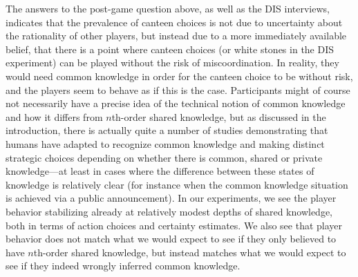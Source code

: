 The answers to the post-game question above, as well as the DIS interviews, indicates that the prevalence of canteen choices is not due to uncertainty about the rationality of other players, but instead due to a more immediately available belief, that there is a point where canteen choices (or white stones in the DIS experiment) can be played without the risk of miscoordination. In reality, they would need common knowledge in order for the canteen choice to be without risk, and the players seem to behave as if this is the case.
Participants might of course not necessarily have a precise idea of the technical notion of common knowledge and how it differs from $n$th-order shared knowledge, but as discussed in the introduction, there is actually quite a number of studies demonstrating that humans have adapted to recognize common knowledge and making distinct strategic choices depending on whether there is common, shared or private knowledge---at least in cases where the difference between these states of knowledge is relatively clear (for instance when the common knowledge situation is achieved via a public announcement). In our experiments, we see the player behavior stabilizing already at relatively modest depths of shared knowledge, both in terms of action choices and certainty estimates. We also see that player behavior does not match what we would expect to see if they only believed to have $n$th-order shared knowledge, but instead matches what we would expect to see if they indeed wrongly inferred common knowledge. 

